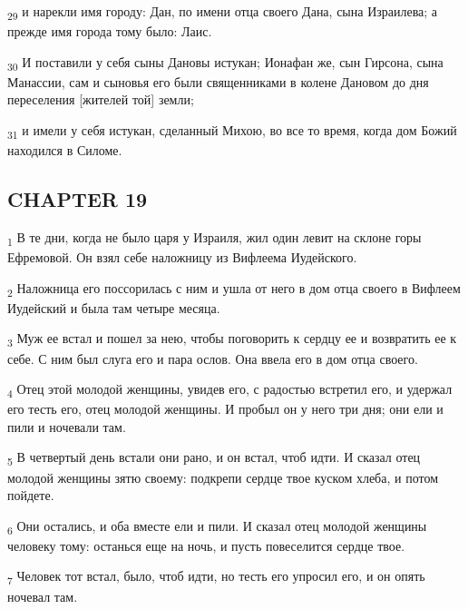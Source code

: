 \begin{tcolorbox}
\textsubscript{29} и нарекли имя городу: Дан, по имени отца своего Дана, сына Израилева; а прежде имя города тому было: Лаис.
\end{tcolorbox}
\begin{tcolorbox}
\textsubscript{30} И поставили у себя сыны Дановы истукан; Ионафан же, сын Гирсона, сына Манассии, сам и сыновья его были священниками в колене Дановом до дня переселения [жителей той] земли;
\end{tcolorbox}
\begin{tcolorbox}
\textsubscript{31} и имели у себя истукан, сделанный Михою, во все то время, когда дом Божий находился в Силоме.
\end{tcolorbox}
\subsection{CHAPTER 19}
\begin{tcolorbox}
\textsubscript{1} В те дни, когда не было царя у Израиля, жил один левит на склоне горы Ефремовой. Он взял себе наложницу из Вифлеема Иудейского.
\end{tcolorbox}
\begin{tcolorbox}
\textsubscript{2} Наложница его поссорилась с ним и ушла от него в дом отца своего в Вифлеем Иудейский и была там четыре месяца.
\end{tcolorbox}
\begin{tcolorbox}
\textsubscript{3} Муж ее встал и пошел за нею, чтобы поговорить к сердцу ее и возвратить ее к себе. С ним был слуга его и пара ослов. Она ввела его в дом отца своего.
\end{tcolorbox}
\begin{tcolorbox}
\textsubscript{4} Отец этой молодой женщины, увидев его, с радостью встретил его, и удержал его тесть его, отец молодой женщины. И пробыл он у него три дня; они ели и пили и ночевали там.
\end{tcolorbox}
\begin{tcolorbox}
\textsubscript{5} В четвертый день встали они рано, и он встал, чтоб идти. И сказал отец молодой женщины зятю своему: подкрепи сердце твое куском хлеба, и потом пойдете.
\end{tcolorbox}
\begin{tcolorbox}
\textsubscript{6} Они остались, и оба вместе ели и пили. И сказал отец молодой женщины человеку тому: останься еще на ночь, и пусть повеселится сердце твое.
\end{tcolorbox}
\begin{tcolorbox}
\textsubscript{7} Человек тот встал, было, чтоб идти, но тесть его упросил его, и он опять ночевал там.
\end{tcolorbox}
